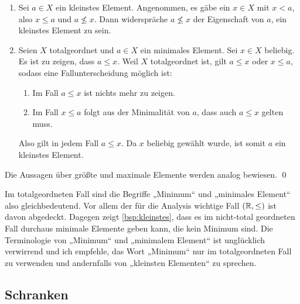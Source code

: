 \begin{bew}
    \quad
    \begin{enumerate}
        \item Sei $a\in X$ ein kleinstes Element. Angenommen, es gäbe ein $x\in X$ mit $x<a$, also $x\le a$ und $a\not\le x$. Dann widerspräche $a\not\le x$ der Eigenschaft von $a$, ein kleinstes Element zu sein.
        \item Seien $X$ totalgeordnet und $a\in X$ ein minimales Element. Sei $x\in X$ beliebig. Es ist zu zeigen, dass $a\le x$. Weil $X$ totalgeordnet ist, gilt $a\le x$ oder $x\le a$, sodass eine Fallunterscheidung möglich ist:
        \begin{enumerate}[1)]
            \item Im Fall $a\le x$ ist nichts mehr zu zeigen.
            \item Im Fall $x\le a$ folgt aus der Minimalität von $a$, dass auch $a\le x$ gelten muss.
        \end{enumerate}
        Also gilt in jedem Fall $a\le x$. Da $x$ beliebig gewählt wurde, ist somit $a$ ein kleinstes Element.
    \end{enumerate}
    Die Aussagen über größte und maximale Elemente werden analog bewiesen. \qed
\end{bew}


\begin{bem}
    Im totalgeordneten Fall sind die Begriffe „Minimum“ und „minimales Element“ also gleichbedeutend. Vor allem der für die Analysis wichtige Fall $(\mathbb R,\le)$ ist davon abgedeckt. Dagegen zeigt \cref{bsp:kleinstes}, dass es im nicht-total geordneten Fall durchaus minimale Elemente geben kann, die kein Minimum sind. Die Terminologie von „Minimum“ und „minimalem Element“ ist unglücklich verwirrend und ich empfehle, das Wort „Minimum“ nur im totalgeordneten Fall zu verwenden und andernfalls von „kleinsten Elementen“ zu sprechen.
\end{bem}


\subsection*{Schranken}


